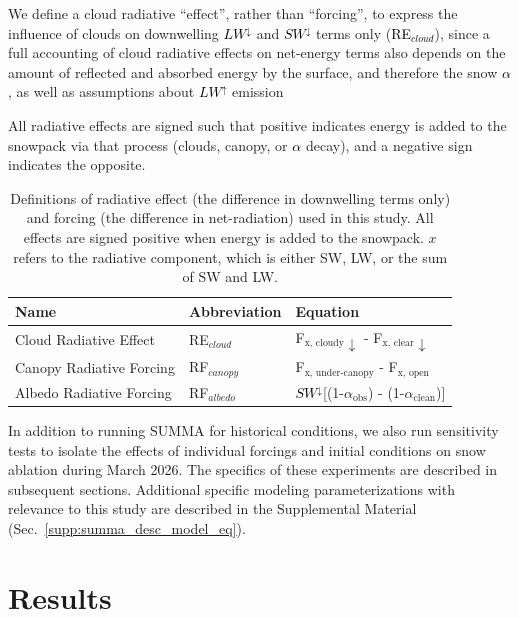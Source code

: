 \documentclass[draft]{agujournal2019}
\newcommand{\lwup}{\textcolor{black}{$LW^{\uparrow}$}\xspace}
\newcommand{\lwdn}{\textcolor{black}{$LW^{\downarrow}$}\xspace}
\newcommand{\swdn}{\textcolor{black}{$SW^{\downarrow}$}\xspace}
\newcommand{\albedo}{\textcolor{black}{$\alpha$}\xspace}
\newcommand{\rfcirrus}{\textcolor{black}{RE$_{cloud}$}\xspace}
\begin{document}
We define a cloud radiative ``effect'', rather than ``forcing'', to express the influence of clouds on downwelling \lwdn and \swdn terms only (\rfcirrus), since a full accounting of cloud radiative effects on net-energy terms also depends on the amount of reflected and absorbed energy by the surface, and therefore the snow \albedo, as well as assumptions about \lwup emission \cite{Rudisill2025-cx} 

All radiative effects are signed such that positive indicates energy is added to the snowpack via that process (clouds, canopy, or \albedo decay), and a negative sign indicates the opposite.

\begin{table}[h]
\centering
\caption{Definitions of radiative effect (the difference in downwelling terms only) and forcing (the difference in net-radiation) used in this study.
All effects are signed positive when energy is added to the snowpack.
$x$ refers to the radiative component, which is either SW, LW, or the sum of SW and LW.}
\label{tab:radiative_effects}
\begin{tabular}{lll}
\hline
\textbf{Name} & \textbf{Abbreviation} & \textbf{Equation} \\
\hline
Cloud Radiative Effect          & RE$_{cloud}$      & F$_\text{x, cloudy}\downarrow$  - F$_\text{x, clear}\downarrow$ \\
Canopy Radiative Forcing        & RF$_{canopy}$     & F$_\text{x, under-canopy}$     - F$_\text{x, open}$ \\
Albedo Radiative Forcing        & RF$_{albedo}$     & \swdn[(1-$\alpha_\text{obs}$)  - (1-$\alpha_\text{clean}$)]\\
\hline
\end{tabular}
\end{table}


In addition to running SUMMA for historical conditions, we also run sensitivity tests to isolate the effects of individual forcings and initial conditions on snow ablation during March 2026. 
The specifics of these experiments are described in subsequent sections.
Additional specific modeling parameterizations with relevance to this study are described in the Supplemental Material (Sec.~\ref{supp:summa_desc_model_eq}).



\section{Results}
\end{document}
